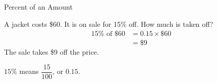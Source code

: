 \documentclass[11pt]{article}
\newif\ifanswers
\newcommand{\strand}[1]{\bigskip{\large\bfseries\sffamily #1}\par\smallskip}
\begin{document}
\ifanswers
\strand{Percent}
\else
\begin{example}{Percent of an Amount}
\begin{minipage}[t]{0.66\linewidth}
A jacket costs \$60. It is on sale for 15\% off. How much is taken off?
\begin{align*}
  15\% \text{ of } \$60 &= 0.15 \times \$60 \\
  &= \$9
\end{align*}
The sale takes \$9 off the price.
\end{minipage}\hfill
\begin{minipage}[t]{0.3\linewidth}
\vspace{0pt}
\begin{notebox}
$15\%$ means $\dfrac{15}{100}$, or $0.15$.
\end{notebox}
\end{minipage}
\end{example}
\fi
\end{document}
